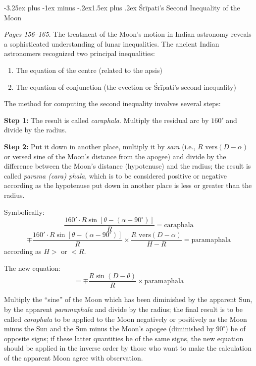 \documentclass[11pt,a4paper]{article}
\makeatletter
\renewcommand{\subsection}{\@startsection{subsection}{2}{\z@}%
  {-3.25ex plus -1ex minus -.2ex}{1.5ex plus .2ex}%
  {\normalfont\large\bfseries\color{sectioncolor}}}
\newcommand{\cnote}[1]{\textcolor{notecolor}{\textit{#1}}}
\makeatother
\begin{document}
\subsection{Śrīpati's Second Inequality of the Moon}

\cnote{Pages 156--165.} The treatment of the Moon's motion in Indian astronomy reveals a sophisticated understanding of lunar inequalities. The ancient Indian astronomers recognized two principal inequalities:

\begin{enumerate}[label=(\roman*)]
\item The equation of the centre (related to the apsis)
\item The equation of conjunction (the evection or Śrīpati's second inequality)
\end{enumerate}

The method for computing the second inequality involves several steps:

\textbf{Step 1:} The result is called \textit{caraphala}. Multiply the residual arc by $160'$ and divide by the radius.

\textbf{Step 2:} Put it down in another place, multiply it by \textit{sara} (i.e., $R \text{ vers}(D - \alpha)$ or versed sine of the Moon's distance from the apogee) and divide by the difference between the Moon's distance (hypotenuse) and the radius; the result is called \textit{parama (cara) phala}, which is to be considered positive or negative according as the hypotenuse put down in another place is less or greater than the radius.

Symbolically:
\[
\frac{160' \cdot R \sin[\theta - (\alpha - 90^\circ)]}{R} = \text{caraphala}
\]
\[
\mp \frac{160' \cdot R \sin[\theta - (\alpha - 90^\circ)]}{R} \times \frac{R \text{ vers}(D - \alpha)}{H - R} = \text{paramaphala}
\]
according as $H >$ or $< R$.

The new equation:
\[
= \mp \frac{R \sin(D - \theta)}{R} \times \text{paramaphala}
\]

Multiply the ``sine'' of the Moon which has been diminished by the apparent Sun, by the apparent \textit{paramaphala} and divide by the radius; the final result is to be called \textit{caraphala} to be applied to the Moon negatively or positively as the Moon minus the Sun and the Sun minus the Moon's apogee (diminished by $90^\circ$) be of opposite signs; if these latter quantities be of the same signs, the new equation should be applied in the inverse order by those who want to make the calculation of the apparent Moon agree with observation.
\end{document}
